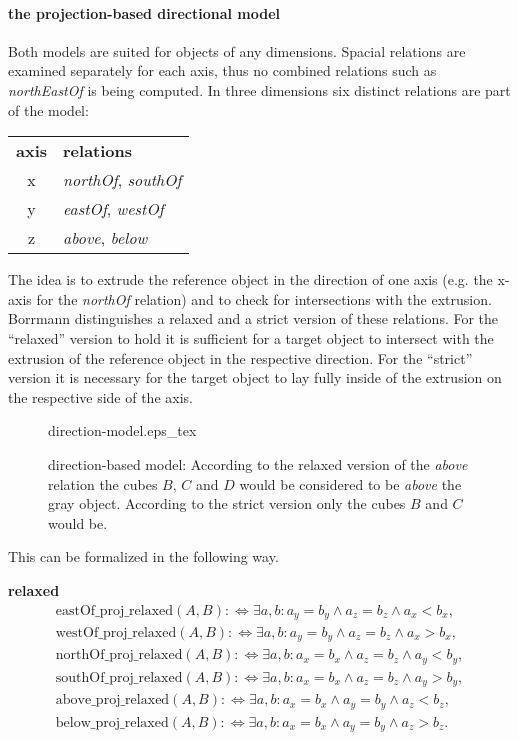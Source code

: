 \documentclass[paper=a4, fontsize=11pt]{scrartcl} %
\numberwithin{equation}{section} %
\numberwithin{figure}{section} %
\numberwithin{table}{section} %
\begin{document}
\paragraph{the projection-based directional model}
Both models are suited for objects of any dimensions. Spacial relations are examined separately for each axis, thus no combined relations such as \emph{northEastOf} is being computed. In three dimensions six distinct relations are part of the model:
\begin{table}[h!]
  \begin{tabular}{cl}
   \textbf{axis} & \textbf{relations} \\
    x  & \emph{northOf}, \emph{southOf} \\
    y  & \emph{eastOf}, \emph{westOf} \\
    z  & \emph{above}, \emph{below}
  \end{tabular}
\end{table}

The idea is to extrude the reference object in the direction of one axis (e.g. the x-axis for the \emph{northOf} relation) and to check for intersections with the extrusion. Borrmann distinguishes a relaxed and a strict version of these relations. For the ``relaxed'' version to hold it is sufficient for a target object to intersect with the extrusion of the reference object in the respective direction. For the ``strict'' version it is necessary for the target object to lay fully inside of the extrusion on the respective side of the axis. 

\begin{figure}
  \centering
  \def\svgwidth{20em}
  {direction-model.eps_tex}
  \caption{direction-based model: According to the relaxed version of the \emph{above} relation the cubes $B$, $C$ and $D$ would be considered to be \emph{above} the gray object. According to the strict version only the cubes $B$ and $C$ would be. }
\label{fig:direction-model}
\end{figure}


This can be formalized in the following way. 


\textbf{relaxed}
\begin{align*}
  \mathrm{eastOf\_proj\_relaxed}(A,B) :\Leftrightarrow \exists a,b:a_y=b_y\wedge a_z=b_z\wedge a_x<b_x, \\
  \mathrm{westOf\_proj\_relaxed}(A,B) :\Leftrightarrow \exists a,b:a_y=b_y\wedge a_z=b_z\wedge a_x>b_x, \\
  \mathrm{northOf\_proj\_relaxed}(A,B) :\Leftrightarrow \exists a,b:a_x=b_x\wedge a_z=b_z\wedge a_y<b_y, \\
  \mathrm{southOf\_proj\_relaxed}(A,B) :\Leftrightarrow \exists a,b:a_x=b_x\wedge a_z=b_z\wedge a_y>b_y, \\
  \mathrm{above\_proj\_relaxed}(A,B) :\Leftrightarrow \exists a,b:a_x=b_x\wedge a_y=b_y\wedge a_z<b_z, \\
  \mathrm{below\_proj\_relaxed}(A,B) :\Leftrightarrow \exists a,b:a_x=b_x\wedge a_y=b_y\wedge a_z>b_z. \\
\end{align*}
\end{document}
